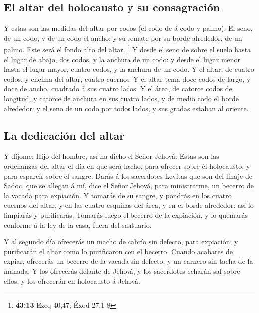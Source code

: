 \hypertarget{el-altar-del-holocausto-y-su-consagraciuxf3n}{%
\subsection{El altar del holocausto y su
consagración}\label{el-altar-del-holocausto-y-su-consagraciuxf3n}}

 Y estas son las medidas del altar por codos (el codo de
á codo y palmo). El seno, de un codo, y de un codo el ancho; y su remate
por su borde alrededor, de un palmo. Este será el fondo alto del altar.
\footnote{\textbf{43:13} Ezeq 40,47; Éxod 27,1-8}  Y
desde el seno de sobre el suelo hasta el lugar de abajo, dos codos, y la
anchura de un codo: y desde el lugar menor hasta el lugar mayor, cuatro
codos, y la anchura de un codo.  Y el altar, de cuatro
codos, y encima del altar, cuatro cuernos.  Y el altar
tenía doce codos de largo, y doce de ancho, cuadrado á sus cuatro lados.
 Y el área, de catorce codos de longitud, y catorce de
anchura en sus cuatro lados, y de medio codo el borde alrededor: y el
seno de un codo por todos lados; y sus gradas estaban al oriente.

\hypertarget{la-dedicaciuxf3n-del-altar}{%
\subsection{La dedicación del altar}\label{la-dedicaciuxf3n-del-altar}}

 Y díjome: Hijo del hombre, así ha dicho el Señor Jehová:
Estas son las ordenanzas del altar el día en que será hecho, para
ofrecer sobre él holocausto, y para esparcir sobre él sangre.
 Darás á los sacerdotes Levitas que son del linaje de
Sadoc, que se allegan á mí, dice el Señor Jehová, para ministrarme, un
becerro de la vacada para expiación.  Y tomarás de su
sangre, y pondrás en los cuatro cuernos del altar, y en las cuatro
esquinas del área, y en el borde alrededor: así lo limpiarás y
purificarás.  Tomarás luego el becerro de la expiación, y
lo quemarás conforme á la ley de la casa, fuera del santuario.

 Y al segundo día ofrecerás un macho de cabrío sin
defecto, para expiación; y purificarán el altar como lo purificaron con
el becerro.  Cuando acabares de expiar, ofrecerás un
becerro de la vacada sin defecto, y un carnero sin tacha de la manada:
 Y los ofrecerás delante de Jehová, y los sacerdotes
echarán sal sobre ellos, y los ofrecerán en holocausto á Jehová.

